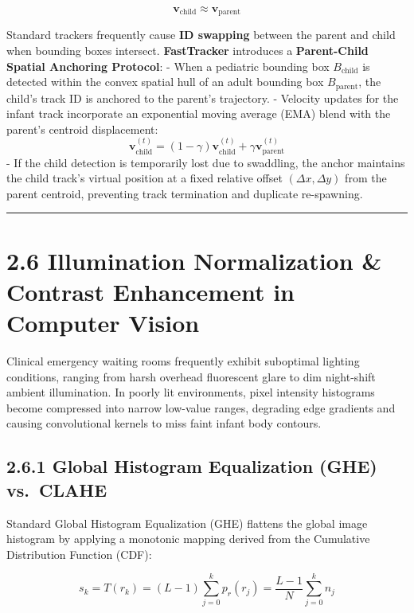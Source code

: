 \[\mathbf{v}_{\text{child}} \approx \mathbf{v}_{\text{parent}}\]

Standard trackers frequently cause \textbf{ID swapping} between the
parent and child when bounding boxes intersect. \textbf{FastTracker}
introduces a \textbf{Parent-Child Spatial Anchoring Protocol}: - When a
pediatric bounding box \(B_{\text{child}}\) is detected within the
convex spatial hull of an adult bounding box \(B_{\text{parent}}\), the
child's track ID is anchored to the parent's trajectory. - Velocity
updates for the infant track incorporate an exponential moving average
(EMA) blend with the parent's centroid displacement:
\[\mathbf{v}_{\text{child}}^{(t)} = (1 - \gamma)\mathbf{v}_{\text{child}}^{(t)} + \gamma \mathbf{v}_{\text{parent}}^{(t)}\]
- If the child detection is temporarily lost due to swaddling, the
anchor maintains the child track's virtual position at a fixed relative
offset \((\Delta x, \Delta y)\) from the parent centroid, preventing
track termination and duplicate re-spawning.

\begin{center}\rule{0.5\linewidth}{0.5pt}\end{center}

\section{2.6 Illumination Normalization \& Contrast Enhancement in
Computer
Vision}\label{illumination-normalization-contrast-enhancement-in-computer-vision}

Clinical emergency waiting rooms frequently exhibit suboptimal lighting
conditions, ranging from harsh overhead fluorescent glare to dim
night-shift ambient illumination. In poorly lit environments, pixel
intensity histograms become compressed into narrow low-value ranges,
degrading edge gradients and causing convolutional kernels to miss faint
infant body contours.

\subsection{2.6.1 Global Histogram Equalization (GHE)
vs.~CLAHE}\label{global-histogram-equalization-ghe-vs.-clahe}

Standard Global Histogram Equalization (GHE) flattens the global image
histogram by applying a monotonic mapping derived from the Cumulative
Distribution Function (CDF):

\[s_k = T(r_k) = (L - 1) \sum_{j=0}^k p_r(r_j) = \frac{L - 1}{N} \sum_{j=0}^k n_j\]

